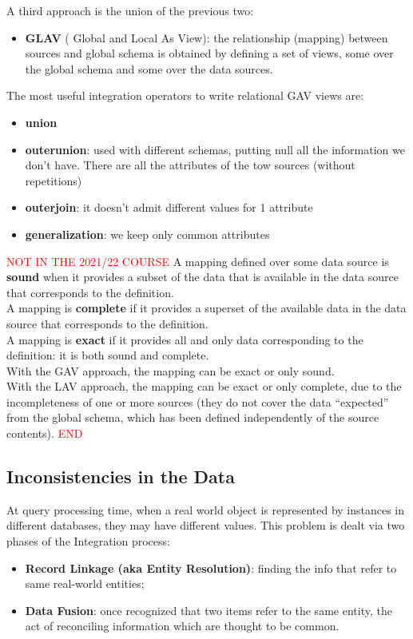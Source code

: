 \documentclass[10pt,a4paper]{article}
\begin{document}
\begin{justify}
\begin{itemize}
\end{itemize}
A third approach is the union of the previous two:
\begin{itemize}
	\item \textbf{GLAV} ( Global and Local As View): the relationship (mapping) between sources and global schema is obtained by defining a set of views, some over the global schema and some over the data sources.
\end{itemize}
The most useful integration operators to write relational GAV views are:
\begin{itemize}
	\item \textbf{union}
	\item \textbf{outerunion}: used with different schemas, putting null all the information we don’t have. There are all the attributes of the tow sources (without repetitions)
	\item \textbf{outerjoin}: it doesn’t admit different values for 1 attribute
	\item \textbf{generalization}: we keep only common attributes
\end{itemize}
 \textcolor{red}{NOT IN THE 2021/22 COURSE}
A mapping defined over some data source is \textbf{sound} when it provides a subset of the data that is available in the data source that corresponds to the definition. \\
A mapping is \textbf{complete} if it provides a superset of the available data in the data source that corresponds to the definition. \\
A mapping is \textbf{exact} if it provides all and only data corresponding to the definition: it is both sound and complete. \\
With the GAV approach, the mapping can be exact or only sound. \\
With the LAV approach, the mapping can be exact or only complete, due to the incompleteness of one or more sources (they do not cover the data “expected” from the global schema, which has been defined independently of the source contents).  \textcolor{red}{END}
\subsection{Inconsistencies in the Data}
At query processing time, when a real world object is represented by instances in different databases, they may have different values. This problem is dealt via two phases of the Integration process:
\begin{itemize}
	\item \textbf{Record Linkage (aka Entity Resolution)}: finding the info that refer to same real-world entities;
	\item \textbf{Data Fusion}: once recognized that two items refer to the same entity, the act of reconciling information which are thought to be common.
\end{itemize}
\end{justify}
\end{document}
